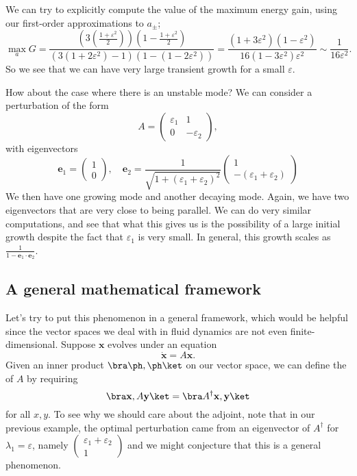 \documentclass[a4paper]{article}
\begin{document}
We can try to explicitly compute the value of the maximum energy gain, using our first-order approximations to $a_{\pm}$;
\[
  \max_a G = \frac{\left(3 \left(\frac{1 + \varepsilon^2}{2}\right)\right)\left(1 - \frac{1 + \varepsilon^2}{2}\right)}{(3(1 + 2\varepsilon^2) - 1)(1 - (1 - 2 \varepsilon^2))} = \frac{(1 + 3 \varepsilon^2)(1 - \varepsilon^2)}{16(1 - 3 \varepsilon^2)\varepsilon^2} \sim \frac{1}{16 \varepsilon^2}.
\]
So we see that we can have very large transient growth for a small $\varepsilon$.

How about the case where there is an unstable mode? We can consider a perturbation of the form
\[
  A =
  \begin{pmatrix}
    \varepsilon_1 & 1\\
    0 & -\varepsilon_2
  \end{pmatrix},
\]
with eigenvectors
\[
  \mathbf{e}_1 =
  \begin{pmatrix}
    1 \\0
  \end{pmatrix},\quad
  \mathbf{e}_2 = \frac{1}{\sqrt{1 + (\varepsilon_1 + \varepsilon_2)^2}}
  \begin{pmatrix}
    1\\
     -(\varepsilon_1 + \varepsilon_2)
  \end{pmatrix}
\]
We then have one growing mode and another decaying mode. Again, we have two eigenvectors that are very close to being parallel. We can do very similar computations, and see that what this gives us is the possibility of a large initial growth despite the fact that $\varepsilon_1$ is very small. In general, this growth scales as $\frac{1}{1 - \mathbf{e}_1 \cdot \mathbf{e}_2}$.

\subsection{A general mathematical framework}
Let's try to put this phenomenon in a general framework, which would be helpful since the vector spaces we deal with in fluid dynamics are not even finite-dimensional. Suppose $\mathbf{x}$ evolves under an equation
\[
  \dot{\mathbf{x}} = A \mathbf{x}.
\]
Given an inner product $\bra \ph, \ph\ket$ on our vector space, we can define the  of $A$ by requiring
\[
  \bra \mathbf{x}, A\mathbf{y}\ket = \bra A^\dagger \mathbf{x}, \mathbf{y}\ket
\]
for all $x, y$. To see why we should care about the adjoint, note that in our previous example, the optimal perturbation came from an eigenvector of $A^\dagger$ for $\lambda_1 = \varepsilon$, namely $\begin{pmatrix} \varepsilon_1 + \varepsilon_2 \\ 1 \end{pmatrix}$ and we might conjecture that this is a general phenomenon.
\end{document}
